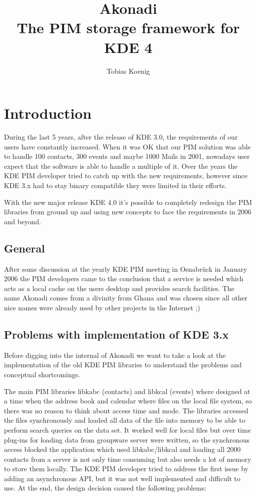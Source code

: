 \documentclass[]{report}
\title{Akonadi\\The PIM storage framework for KDE 4}
\author{Tobias Koenig}
\begin{document}
\maketitle

\tableofcontents

\chapter{Introduction}

During the last 5 years, after the release of KDE 3.0, the requirements of our users
have constantly increased. When it was OK that our PIM solution was able to handle 100 contacts,
300 events and maybe 1000 Mails in 2001, nowadays user expect that the software is able to
handle a multiple of it. Over the years the KDE PIM developer tried to catch up with the new
requirements, however since KDE 3.x had to stay binary compatible they were limited in their
efforts.

With the new major release KDE 4.0 it's possible to completely redesign the PIM libraries from
ground up and using new concepts to face the requirements in 2006 and beyond.

\section{General}

After some discussion at the yearly KDE PIM meeting in Osnabrück in January 2006 the PIM developers
came to the conclusion that a service is needed which acts as a local cache on the users desktop
and provides search facilities. The name Akonadi comes from a divinity from Ghana and was chosen since
all other nice names were already used by other projects in the Internet ;)

\section{Problems with implementation of KDE 3.x}

Before digging into the internal of Akonadi we want to take a look at the implementation of the
old KDE PIM libraries to understand the problems and conceptual shortcomings.

The main PIM libraries libkabc (contacts) and libkcal (events) where designed at a time when the
address book and calendar where files on the local file system, so there was no reason to think
about access time and mode. The libraries accessed the files synchronously and loaded all data of the
file into memory to be able to perform search queries on the data set. It worked well for local files
but over time plug-ins for loading data from groupware server were written, so the synchronous access blocked
the application which used libkabc/libkcal and loading all 2000 contacts from a server is not only
time consuming but also needs a lot of memory to store them locally. The KDE PIM developer tried to
address the first issue by adding an asynchronous API, but it was not well implemented and difficult to use.
At the end, the design decision caused the following problems:
\end{document}
